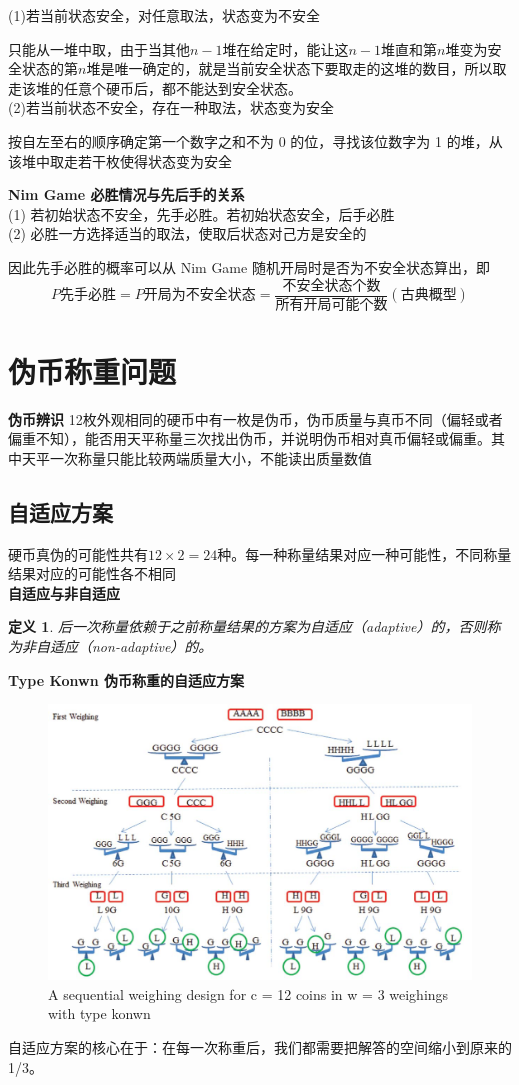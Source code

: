 \documentclass[10t, a4paper, oneside]{ctexbook}
\newtheorem{definition}[theorem]{定义}
\begin{document}
\noindent(1)若当前状态安全，对任意取法，状态变为不安全

    只能从一堆中取，由于当其他$n-1$堆在给定时，能让这$n-1$堆直和第$n$堆变为安全状态的第$n$堆是唯一确定的，就是当前安全状态下要取走的这堆的数目，所以取走该堆的任意个硬币后，都不能达到安全状态。\\
(2)若当前状态不安全，存在一种取法，状态变为安全

    按自左至右的顺序确定第一个数字之和不为 0 的位，寻找该位数字为 1 的堆，从该堆中取走若干枚使得状态变为安全

\noindent\textbf{Nim Game 必胜情况与先后手的关系}\\
(1) 若初始状态不安全，先手必胜。若初始状态安全，后手必胜\\
(2) 必胜一方选择适当的取法，使取后状态对己方是安全的

因此先手必胜的概率可以从 Nim Game 随机开局时是否为不安全状态算出，即
$$P{\text{先手必胜}} = P{\text{开局为不安全状态}} = \frac{\text{不安全状态个数}}{\text{所有开局可能个数}}(\text{古典概型})$$

\section{伪币称重问题}
\noindent\textbf{伪币辨识}
12枚外观相同的硬币中有一枚是伪币，伪币质量与真币不同（偏轻或者偏重不知），能否用天平称量三次找出伪币，并说明伪币相对真币偏轻或偏重。其中天平一次称量只能比较两端质量大小，不能读出质量数值
\subsection{自适应方案}
硬币真伪的可能性共有$12\times2 = 24$种。每一种称量结果对应一种可能性，不同称量结果对应的可能性各不相同\\
\textbf{自适应与非自适应}
\begin{definition}
后一次称量依赖于之前称量结果的方案为自适应（adaptive）的，否则称为非自适应（non-adaptive）的。\\
\end{definition}
\textbf{Type Konwn 伪币称重的自适应方案}
\begin{figure}[H]
    \centering
    \includegraphics[width = 15cm]{assets/sequential_weighing_design.png}
    \caption{A sequential weighing design for c = 12 coins in w = 3 weighings with type konwn}
\end{figure}
自适应方案的核心在于：在每一次称重后，我们都需要把解答的空间缩小到原来的 1/3。
\end{document}
